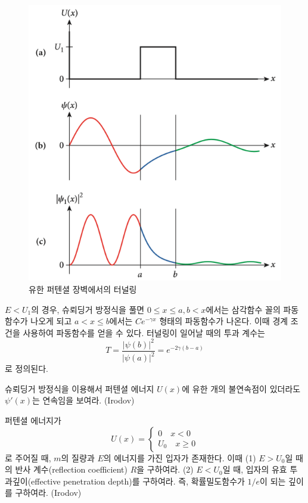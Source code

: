 \begin{figure}[h!]
\centering\includegraphics[scale=0.4]{Pictures/tunneling.PNG}
\caption{유한 퍼텐셜 장벽에서의 터널링}
\label{fig:tunneling}
\end{figure}
$E<U_1$의 경우, 슈뢰딩거 방정식을 풀면 $0\le x\le a, b<x$에서는 삼각함수 꼴의 파동함수가 나오게 되고 $a< x\le b$에서는 $Ce^{-\gamma x}$ 형태의 파동함수가 나온다.  이때 경계 조건을 사용하여 파동함수를 얻을 수 있다. 터널링이 일어날 때의 투과 계수는
\begin{equation}
T=\frac{|\psi(b)|^2}{|\psi(a)|^2}=e^{-2\gamma(b-a)}
\end{equation}
로 정의된다.

\begin{problem}
슈뢰딩거 방정식을 이용해서 퍼텐셜 에너지 $U(x)$에 유한 개의 불연속점이 있더라도 $\psi'(x)$는 연속임을 보여라. (Irodov)
\end{problem}

\begin{problem}
퍼텐셜 에너지가
\begin{equation}
U(x)=\begin{cases}
0\quad x<0\\
U_0\quad x\ge 0
\end{cases}
\end{equation}
로 주어질 때, $m$의 질량과 $E$의 에너지를 가진 입자가 존재한다. 이때 (1) $E>U_0$일 때의 반사 계수(reflection coefficient) $R$을 구하여라. (2) $E<U_0$일 때, 입자의 유효 투과깊이(effective penetration depth)를 구하여라. 즉, 확률밀도함수가 $1/e$이 되는 깊이를 구하여라. (Irodov)
\end{problem}

